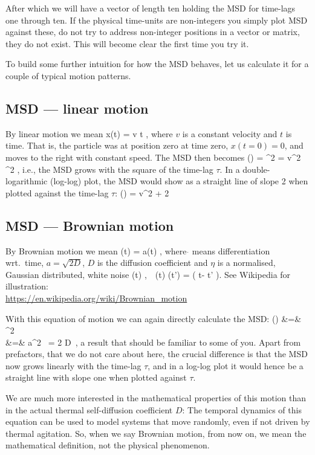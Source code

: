 After which we will have a vector of length ten holding the MSD for time-lags one through ten.
If the physical time-units are non-integers you simply plot MSD against these, do not try to address non-integer positions in a vector or matrix, they do not exist. This will become clear the first time you try it.

To build some further intuition for how the MSD behaves, let us calculate it for a couple of typical motion patterns.

\subsection{MSD --- linear  motion}
By linear motion we mean
\be
  x(t) = v t \e,
\ee
where $v$ is a constant velocity and $t$ is time.
That is, the particle was at position zero at time zero, $x(t=0)=0$, and moves to the right with constant speed.
The MSD then becomes
\be
  \msd(\tau) = \la {}^2 \ra = v^2 \tau^2 \e,
\ee
i.e., the MSD grows with the square of the time-lag $\tau$. In a double-logarithmic (log-log) plot, the MSD would show as a straight line of slope 2 when plotted against the time-lag $\tau$:
\be
  \log\msd(\tau) = \log v^2 + 2 \log \tau 
\ee

\subsection{MSD --- Brownian motion}
By Brownian motion we mean
\be
  (t) = a\eta(t) \e,
\ee
where $\dot{}$ means differentiation wrt.\ time, $a = \sqrt{2D}$, $D$ is the diffusion coefficient and $\eta$ is a normalised, Gaussian distributed, white noise
\be
  \la\eta(t)  ,\,\,\,\, \la \eta(t) \eta(t') \ra = \delta( t- t' )\e.
\ee
See Wikipedia for illustration:\\
\url{https://en.wikipedia.org/wiki/Brownian_motion}

With this equation of motion we can again directly calculate the MSD:
\bea
  \msd(\tau) &=& \la {}^2 \ra \\
&=& a^2 \, \tau = 2 D \,\tau \e,
\eea
a result that should be familiar to some of you. 
Apart from prefactors, that we do not care about here, the crucial difference is that the MSD now grows linearly with the time-lag $\tau$, and in a log-log plot it would hence be a straight line with slope one when plotted against $\tau$.

We are much more interested in the mathematical properties of this motion than in the actual thermal self-diffusion coefficient $D$: The temporal dynamics of this equation can be used to model systems that move randomly, even if not driven by thermal agitation.  So, when we say Brownian motion, from now on, we mean the mathematical definition, not the physical phenomenon.

